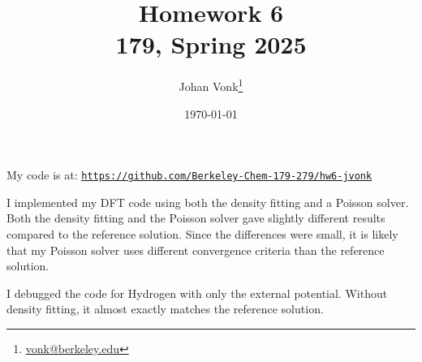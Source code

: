 \documentclass[10pt]{article}
\title{Homework 6\\\large  179, Spring 2025}
\author{Johan Vonk\thanks{\href{mailto:vonk@berkeley.edu}{vonk@berkeley.edu}}}
\date{\today}
\begin{document}
    \maketitle
    My code is at: \href{https://github.com/Berkeley-Chem-179-279/hw6-jvonk}{\texttt{https://github.com/Berkeley-Chem-179-279/hw6-jvonk}}\\
    \begin{problems}
        \item I implemented my DFT code using both the density fitting and a Poisson solver.
        Both the density fitting and the Poisson solver gave slightly different results compared to the reference solution.
        Since the differences were small, it is likely that my Poisson solver uses different convergence criteria than the reference solution.
        \item I debugged the code for Hydrogen with only the external potential.
        Without density fitting, it almost exactly matches the reference solution.
        \item {}
    \end{problems}
\end{document}
